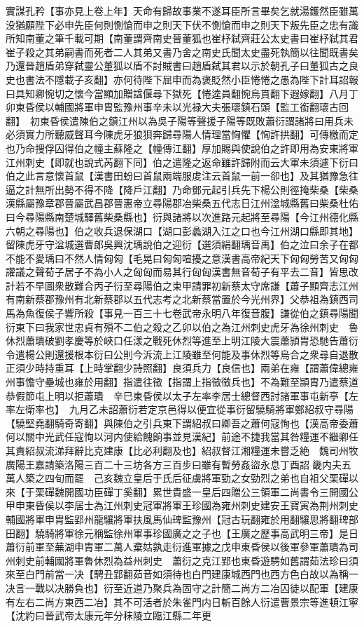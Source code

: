 實謀孔矜【事亦見上卷上年】天命有歸故事業不遂耳臣所言畢矣乞就湯鑊然臣雖萬没猶願陛下必申先臣何則惻愴而申之則天下伏不惻愴而申之則天下叛先臣之忠有識所知南董之筆千載可期【南董謂齊南史晉董狐也崔杼弑齊莊公太史書曰崔杼弑其君崔子殺之其弟嗣書而死者二人其弟又書乃舍之南史氏聞太史盡死執簡以往聞既書矣乃還晉趙盾弟穿弑靈公董狐以盾不討賊書曰趙盾弑其君以示於朝孔子曰董狐古之良史也書法不隱載子亥翻】亦何待陛下屈申而為褒貶然小臣惓惓之愚為陛下計耳詔報曰具知卿惋切之懷今當顯加贈諡偃尋下獄死【惓逵員翻惋烏貫翻下遐嫁翻】八月丁卯東昏侯以輔國將軍申胄監豫州事辛未以光禄大夫張瓌鎮石頭【監工銜翻瓌古回翻】　初東昏侯遣陳伯之鎮江州以為吳子陽等聲援子陽等既敗蕭衍謂諸將曰用兵未必須實力所聽威聲耳今陳虎牙狼狽奔歸尋陽人情理當恟懼【恟許拱翻】可傳檄而定也乃命搜俘囚得伯之幢主蘇隆之【幢傳江翻】厚加賜與使說伯之許即用為安東將軍江州刺史【即就也說式芮翻下同】伯之遣隆之返命雖許歸附而云大軍未須遽下衍曰伯之此言意懷首鼠【漢書田蚡曰首鼠兩端服䖍注云首鼠一前一卻也】及其猶豫急往逼之計無所出勢不得不降【降戶江翻】乃命鄧元起引兵先下楊公則徑掩柴桑【柴桑漢縣屬豫章郡晉屬武昌郡晉惠帝立尋陽郡冶柴桑五代志日江州湓城縣舊曰柴桑杜佑曰今尋陽縣南楚城驛舊柴桑縣也】衍與諸將以次進路元起將至尋陽【今江州德化縣六朝之尋陽也】伯之收兵退保湖口【湖口彭蠡湖入江之口也今江州湖口縣即其地】留陳虎牙守湓城選曹郎吳興沈瑀說伯之迎衍【選須絹翻瑀音禹】伯之泣曰余子在都不能不愛瑀曰不然人情匈匈【毛晃曰匈匈喧擾之意漢書高帝紀天下匈匈勞苦又匈匈讙議之聲荀子居子不為小人之匈匈而易其行匈匈漢書無音荀子有平去二音】皆思改計若不早圖衆散難合丙子衍至尋陽伯之束甲請罪初新蔡太守席謙【蕭子顯齊志江州有南新蔡郡豫州有北新蔡郡以五代志考之北新蔡當置於今光州界】父恭祖為鎮西司馬為魚復侯子響所殺【事見一百三十七卷武帝永明八年復音腹】謙從伯之鎮尋陽聞衍東下曰我家世忠貞有殞不二伯之殺之乙卯以伯之為江州刺史虎牙為徐州刺史　魯休烈蕭璝破劉孝慶等於峽口任漾之戰死休烈等進至上明江陵大震蕭頴胄恐馳告蕭衍令遣楊公則還援根本衍曰公則今泝流上江陵雖至何能及事休烈等烏合之衆尋自退散正須少時持重耳【上時掌翻少詩照翻】良須兵力【良信也】兩弟在雍【謂蕭偉總雍州事憺守壘城也雍於用翻】指遣往徵【指謂上指徵徵兵也】不為難至頴胄乃遣蔡道恭假節屯上明以拒蕭璝　辛巳東昏侯以太子左率李居士總督西討諸軍事屯新亭【左率左衛率也】　九月乙未詔蕭衍若定京邑得以便宜從事衍留驍騎將軍鄭紹叔守尋陽【驍堅堯翻騎奇寄翻】與陳伯之引兵東下謂紹叔曰卿吾之蕭何寇恂也【漢高帝委蕭何以關中光武任寇恂以河内使給餽餉事並見漢紀】前途不捷我當其咎糧運不繼卿任其責紹叔流涕拜辭比克建康【比必利翻及也】紹叔督江湘糧運未嘗乏絶　魏司州牧廣陽王嘉請築洛陽三百二十三坊各方三百步曰雖有暫勞姦盜永息丁酉詔畿内夫五萬人築之四旬而罷　己亥魏立皇后于氏后征虜將軍勁之女勁烈之弟也自祖父栗磾以來【于栗磾魏開國功臣磾丁奚翻】累世貴盛一皇后四贈公三領軍二尚書令三開國公　甲申東昏侯以李居士為江州刺史冠軍將軍王珍國為雍州刺史建安王寶寅為荆州刺史輔國將軍申胄監郢州龍驤將軍扶風馬仙琕監豫州【冠古玩翻雍於用翻驤思將翻琕部田翻】驍騎將軍徐元稱監徐州軍事珍國廣之之子也【王廣之歷事高武明三帝】是日蕭衍前軍至蕪湖申胄軍二萬人棄姑孰走衍進軍據之戊申東昏侯以後軍參軍蕭璝為司州刺史前輔國將軍魯休烈為益州刺史　蕭衍之克江郢也東昏遊騁如舊謂茹法珍曰須來至白門前當一决【騁丑郢翻茹音如須待也白門建康城西門也西方色白故以為稱一决言一戰以决勝負也】衍至近道乃聚兵為固守之計簡二尚方二冶囚徒以配軍【建康有左右二尚方東西二冶】其不可活者於朱雀門内日斬百餘人衍遣曹景宗等進頓江寧【沈約曰晉武帝太康元年分秣陵立臨江縣二年更